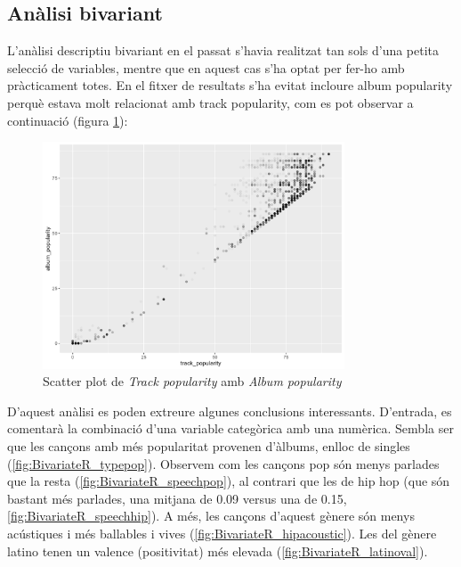 \subsection{Anàlisi bivariant}

L’anàlisi descriptiu bivariant en el passat s'havia realitzat tan sols d’una petita selecció de variables, mentre que en aquest cas s’ha optat per fer-ho amb pràcticament totes. En el fitxer de resultats s’ha evitat incloure album popularity perquè estava molt relacionat amb track popularity, com es pot observar a continuació (figura \ref{fig:BivariateR_trackalbum}):

\begin{figure}[H]
    \centering
    \includegraphics[width=0.8\textwidth]{Images/2_Bivariate/trackalbum.png}
    \caption{Scatter plot de \textit{Track popularity} amb \textit{Album popularity}}
    \label{fig:BivariateR_trackalbum}
\end{figure}

D’aquest anàlisi es poden extreure algunes conclusions interessants. D'entrada, es comentarà la combinació d'una variable categòrica amb una numèrica. Sembla ser que les cançons amb més popularitat provenen d’àlbums, enlloc de singles (\ref{fig:BivariateR_typepop}). Observem com les cançons pop són menys parlades que la resta (\ref{fig:BivariateR_speechpop}), al contrari que les de hip hop (que són bastant més parlades, una mitjana de 0.09 versus una de 0.15, \ref{fig:BivariateR_speechhip}). A més, les cançons d'aquest gènere són menys acústiques i més ballables i vives (\ref{fig:BivariateR_hipacoustic}). Les del gènere latino tenen un valence (positivitat) més elevada (\ref{fig:BivariateR_latinoval}).


